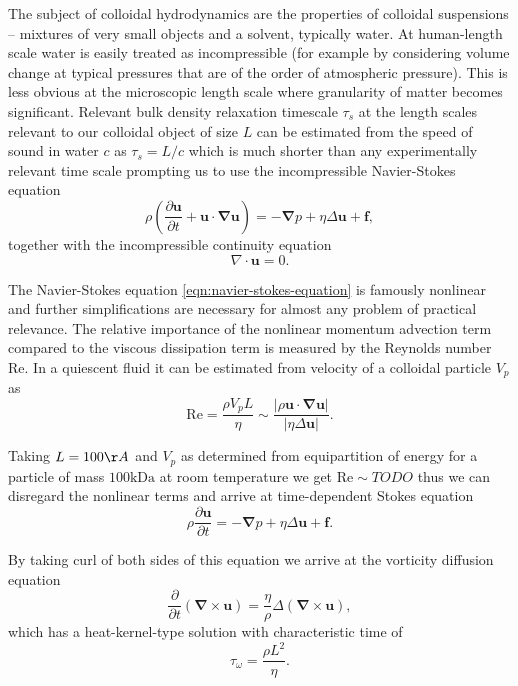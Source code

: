 \documentclass{doctoral}
\newcommand{\pd}{\partial}
\newcommand{\Reynolds}{\mathrm{Re}}
\begin{document}
The subject of colloidal hydrodynamics are the properties of colloidal suspensions -- mixtures of very small objects and a solvent, typically water. At human-length scale water is easily treated as incompressible (for example by considering volume change at typical pressures that are of the order of atmospheric pressure). This is less obvious at the microscopic length scale where granularity of matter becomes significant. Relevant bulk density relaxation timescale $\tau_s$ at the length scales relevant to our colloidal object of size $L$ can be estimated from the speed of sound in water $c$ as
$\tau_s = L/c$ which is much shorter than any experimentally relevant time scale prompting us to use the incompressible Navier-Stokes equation
\begin{equation}
    \rho \left( \frac{\pd \bm{u}}{\pd t} + \bm{u} \cdot \bm{\nabla u} \right) = - \bm{\nabla} p + \eta \Delta \bm{u} + \bm{f},
    \label{eqn:navier-stokes-equation}
\end{equation}
together with the incompressible continuity equation
\begin{equation}
    \nabla \cdot \bm{u} = 0
    \label{eqn:incompressibility}.
\end{equation}

The Navier-Stokes equation \eqref{eqn:navier-stokes-equation} is famously nonlinear and further simplifications are necessary for almost any problem of practical relevance. The relative importance of the nonlinear momentum advection term compared to the viscous dissipation term is measured by the Reynolds number $\Reynolds$. In a quiescent fluid it can be estimated from velocity of a colloidal particle $V_p$ as
\begin{equation}
    \Reynolds = \frac{\rho V_p L}{\eta} \sim \frac{|\rho \bm{u} \cdot \bm{\nabla}\bm{u}|}{|\eta \Delta \bm{u}|}.
    \label{eqn:reynolds-based-estimate}
\end{equation}

Taking $L = 100\AA$ and $V_p$ as determined from equipartition of energy for a particle of mass $100 \mathrm{k Da}$ at room temperature we get $\Reynolds \sim TODO$ thus we can disregard the nonlinear terms and arrive at time-dependent Stokes equation
\begin{equation}
    \rho \frac{\pd \bm{u}}{\pd t} = - \bm{\nabla} p + \eta \Delta \bm{u} + \bm{f}.
    \label{eqn:time-dependent-stokes-equation}
\end{equation}

By taking curl of both sides of this equation we arrive at the vorticity diffusion equation
\begin{equation}
    \frac{\pd}{\pd t} \left( \bm{\nabla} \times \bm{u} \right) = \frac{\eta}{\rho} \Delta \left( \bm{\nabla} \times \bm{u} \right),
    \label{eqn:vorticity-diffusion}
\end{equation}
which has a heat-kernel-type solution with characteristic time of
\begin{equation}
    \tau_\omega = \frac{\rho L^2}{\eta}.
    \label{eqn:vorticity-timescale}
\end{equation}
\end{document}
